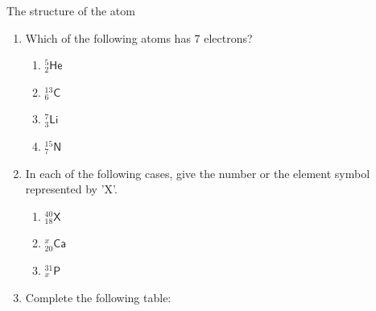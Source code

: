 \begin{exercises}{The structure of the atom}
\begin{enumerate}[noitemsep, label=\textbf{\arabic*}. ]
For the element $_{17}^{35}\mathsf{Cl}$, give the number of ...
\label{m38745*id256843}\begin{enumerate}[noitemsep, label=\textbf{\alph*}. ] 
            \label{m38745*uid25}\item protons
\label{m38745*uid26}\item neutrons
\label{m38745*uid27}\item electrons
\end{enumerate}
... in the atom.\newline
\label{m38745*uid28}\item Which of the following atoms has 7 electrons?
\label{m38745*id256898}\begin{enumerate}[noitemsep, label=\textbf{\alph*}. ] 
            \label{m38745*uid29}\item $_{2}^{5}\mathsf{He}$
\label{m38745*uid30}\item $_{6}^{13}\mathsf{C}$
\label{m38745*uid31}\item $_{3}^{7}\mathsf{Li}$
\label{m38745*uid32}\item $_{7}^{15}\mathsf{N}$
\end{enumerate}
                \label{m38745*uid33}\item 
In each of the following cases, give the number or the element symbol represented by 'X'.
\label{m38745*id257023}\begin{enumerate}[noitemsep, label=\textbf{\alph*}. ] 
            \label{m38745*uid34}\item $_{18}^{40}\mathsf{X}$
\label{m38745*uid35}\item $_{20}^{x}\mathsf{Ca}$
\label{m38745*uid36}\item $_{x}^{31}\mathsf{P}$
\end{enumerate}
                \label{m38745*uid37}\item 
Complete the following table:
          \begin{table}[H]
        \begin{center}
      \label{m38745*id257121}
    \noindent
      \tablelasttail{}
      \begin{xtabular}[t]{|l|l|l|l|}\hline

\end{xtabular}
\end{center}
\end{table}
\end{enumerate}
\end{exercises}
